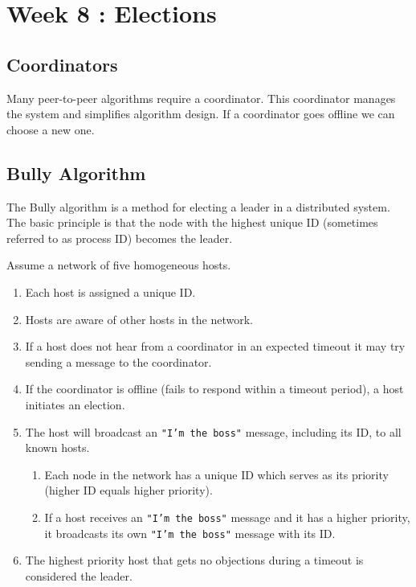 \section{Week 8 : Elections}

\subsection{Coordinators}
Many peer-to-peer algorithms require a coordinator. This coordinator manages the system and simplifies algorithm design. If a coordinator goes offline we can choose a new one.

\subsection{Bully Algorithm}
The Bully algorithm is a method for electing a leader in a distributed system. The basic principle is that the node with the highest unique ID (sometimes referred to as process ID) becomes the leader.

\noindent Assume a network of five homogeneous hosts.
\begin{enumerate}[label=\roman*), noitemsep, topsep=1pt]
\item Each host is assigned a unique ID.
\item Hosts are aware of other hosts in the network.
\item If a host does not hear from a coordinator in an expected timeout it may try sending a message to the coordinator.
\item If the coordinator is offline (fails to respond within a timeout period), a host initiates an election.
\item The host will broadcast an \texttt{"I'm the boss"} message, including its ID, to all known hosts.
\begin{enumerate}[label=\roman*), noitemsep]
\item Each node in the network has a unique ID which serves as its priority (higher ID equals higher priority).
\item If a host receives an \texttt{"I'm the boss"} message and it has a higher priority, it broadcasts its own \texttt{"I'm the boss"} message with its ID.
\end{enumerate}
\item The highest priority host that gets no objections during a timeout is considered the leader.
\end{enumerate}



